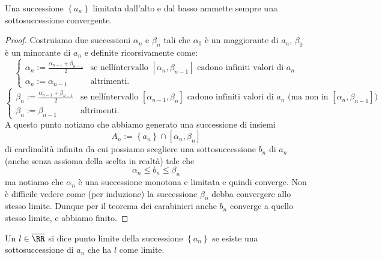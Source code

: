 \documentclass[11pt]{scrartcl}
\begin{document}
	\begin{theorem}
		Una successione $\left\{a_n\right\}$ limitata dall'alto e dal basso ammette sempre una sottosuccessione convergente.
	\end{theorem}
	\begin{proof}
		Costruiamo due successioni $\alpha_n$ e $\beta_n$ tali che $\alpha_0$ è un maggiorante di $a_n$, $\beta_0$ è un minorante di $a_n$ e definite ricorsivamente come:
		$$
		\begin{cases}
			\alpha_n:=\frac{\alpha_{n-1}+\beta_{n-1}}{2} & \text{se nell\'intervallo $[\alpha_n,\beta_{n-1}]$ cadono infiniti valori di $a_n$} \\
			\alpha_n:=\alpha_{n-1} & \text{altrimenti.} 
		\end{cases}
		$$
		$$
		\begin{cases}
			\beta_n:=\frac{\alpha_{n-1}+\beta_{n-1}}{2} & \text{se nell\'intervallo $[\alpha_{n-1},\beta_{n}]$ cadono infiniti valori di $a_n$ (ma non in $[\alpha_n,\beta_{n-1}]$)} \\
			\beta_n:=\beta_{n-1} & \text{altrimenti.} 
		\end{cases}
		$$
		A questo punto notiamo che abbiamo generato una successione di insiemi 
		$$A_n:=\left\{a_n\right\}\cap [\alpha_n,\beta_n]$$
		di cardinalità infinita da cui possiamo scegliere una sottosuccessione $b_n$ di $a_n$ (anche senza assioma della scelta in realtà) tale che 
		$$\alpha_n\le b_n\le \beta_n$$
		ma notiamo che $\alpha_n$ è una successione monotona e limitata e quindi converge. Non è difficile vedere come (per induzione) la successione $\beta_n$ debba convergere allo stesso limite. Dunque per il teorema dei carabinieri anche $b_n$ converge a quello stesso limite, e abbiamo finito.
	\end{proof}
	
	\begin{definition}
		Un $l\in\overline{\RR}$ si dice punto limite della successione $\left\{a_n\right\}$ se esiste una sottosuccessione di $a_n$ che ha $l$ come limite.
	\end{definition}
	
\end{document}
